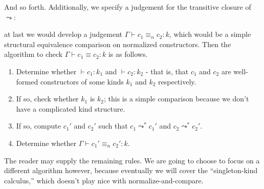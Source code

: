 \documentclass{article}
\newcommand{\type}{\ensuremath{\mathtt{type}}}
\begin{document}

And so forth. Additionally, we specify a judgement for the transitive closure of $\leadsto$:


at last we would develop a judgement $\Gamma \vdash c_1 \equiv_n c_2 : k$,
which would be a simple structural equivalence comparison on normalized
constructors. Then the algorithm to check $\Gamma \vdash c_1 \equiv c_2 : k$
is as follows.

\begin{enumerate}
    \item Determine whether $\vdash c_1 : k_1$ and $\vdash c_2 : k_2$ -
      that is, that $c_1$ and $c_2$ are well-formed constructors of some
      kinds $k_1$ and $k_2$ respectively.

    \item If so, check whether $k_1$ is $k_2$; this is a simple
      comparison because we don't have a complicated kind structure.

    \item If so, compute $c_1'$ and $c_2'$ such that $c_1 \leadsto^*
      c_1'$ and $c_2 \leadsto^* c_2'$.

    \item Determine whether $\Gamma \vdash c_1' \equiv_n c_2' : k$.
\end{enumerate}

The reader may supply the remaining rules. We are going to choose to focus on a
different algorithm however, because eventually we will cover the
``singleton-kind calculus,'' which doesn't play nice with normalize-and-compare.
\end{document}
